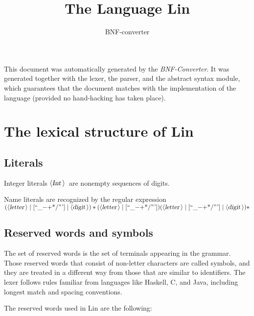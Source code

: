 \documentclass[a4paper,11pt]{article}
\author{BNF-converter}
\title{The Language Lin}
\begin{document}
\maketitle

\newcommand{\emptyP}{\mbox{$\epsilon$}}
\newcommand{\terminal}[1]{\mbox{{\texttt {#1}}}}
\newcommand{\nonterminal}[1]{\mbox{$\langle \mbox{{\sl #1 }} \! \rangle$}}
\newcommand{\arrow}{\mbox{::=}}
\newcommand{\delimit}{\mbox{$|$}}
\newcommand{\reserved}[1]{\mbox{{\texttt {#1}}}}
\newcommand{\literal}[1]{\mbox{{\texttt {#1}}}}
\newcommand{\symb}[1]{\mbox{{\texttt {#1}}}}

This document was automatically generated by the {\em BNF-Converter}. It was generated together with the lexer, the parser, and the abstract syntax module, which guarantees that the document matches with the implementation of the language (provided no hand-hacking has taken place).

\section*{The lexical structure of Lin}

\subsection*{Literals}
Integer literals \nonterminal{Int}\ are nonempty sequences of digits.




Name literals are recognized by the regular expression
\(({\nonterminal{letter}} \mid [\mbox{``\_{$-$}{$+$}*/'''}] \mid {\nonterminal{digit}})* ({\nonterminal{letter}} \mid [\mbox{``\_{$-$}{$+$}*/'''}]) ({\nonterminal{letter}} \mid [\mbox{``\_{$-$}{$+$}*/'''}] \mid {\nonterminal{digit}})*\)


\subsection*{Reserved words and symbols}
The set of reserved words is the set of terminals appearing in the grammar. Those reserved words that consist of non-letter characters are called symbols, and they are treated in a different way from those that are similar to identifiers. The lexer follows rules familiar from languages like Haskell, C, and Java, including longest match and spacing conventions.

The reserved words used in Lin are the following: \\
\end{document}
